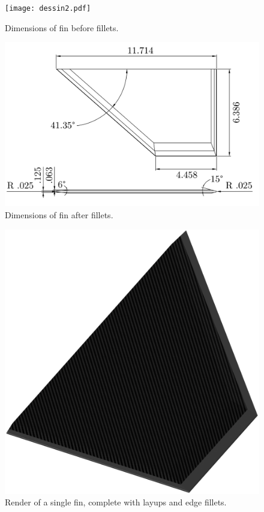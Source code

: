 \documentclass{amsdtx}
\begin{document}
\begin{multicols}{2}
\begin{figure}[H]
\centering
\texttt{[image: dessin2.pdf]}	
\caption{Dimensions of fin before fillets.}
\end{figure}
\begin{figure}[H]
\centering
\includegraphics[scale=0.02]{dessin1.pdf}	
\caption{Dimensions of fin after fillets.}
\end{figure}

\end{multicols}
\begin{figure}[H]
\centering
\includegraphics[scale=0.35]{render1.png}	
\caption{Render of a single fin, complete with layups and edge fillets.}
\end{figure}
~\\[2em]
\end{document}
